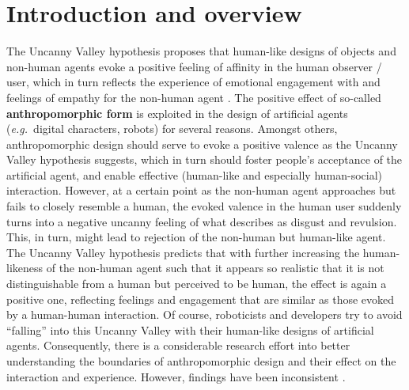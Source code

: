 \documentclass{frontiersSCNS} %
\newcommand{\eg}{{\textit{e.g.~}}}
\begin{document}
\section{Introduction and overview}
\label{sec:intro}

The Uncanny Valley hypothesis \citep{mori_uncanny_1970} proposes that human-like designs of objects and non-human agents evoke a positive feeling of affinity in the human observer / user, which in turn reflects the experience of emotional engagement with and feelings of empathy for the non-human agent \citep{cheetham_human_2011}. The positive effect of so-called \textbf{anthropomorphic form} is exploited in the design of artificial agents (\eg digital characters, robots) for several reasons. Amongst others, anthropomorphic design should serve to evoke a positive valence as the Uncanny Valley hypothesis suggests, which in turn should foster people's acceptance of the artificial agent, and enable effective (human-like and especially human-social) interaction. 
However, at a certain point as the non-human agent approaches but fails to closely resemble a human, the evoked valence in the human user suddenly turns into a negative uncanny feeling of what \cite{mori_uncanny_1970} describes as disgust and revulsion. This, in turn, might lead to rejection of the non-human but human-like agent.
The Uncanny Valley hypothesis predicts that with further increasing the human-likeness of the non-human agent such that it appears so realistic that it is not distinguishable from a human but perceived to be human, the effect is again a positive one, reflecting feelings and engagement that are similar as those evoked by a human-human interaction.
Of course, roboticists and developers try to avoid ``falling'' into this Uncanny Valley with their human-like designs of artificial agents. Consequently, there is a considerable research effort into better understanding the boundaries of anthropomorphic design and their effect on the interaction and experience. However, findings have been inconsistent \citep{cheetham_human_2011}.
\end{document}
